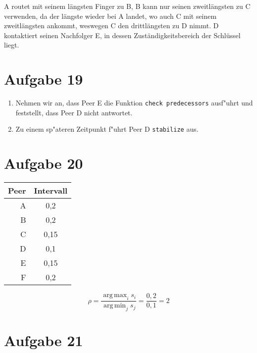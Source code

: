 \documentclass[10pt,a4paper]{article}
\DeclareMathOperator*{\argmax}{arg\,max}
\DeclareMathOperator*{\argmin}{arg\,min}
\begin{document}
A routet mit seinem längsten Finger zu B, B kann nur seinen zweitlängsten zu C verwenden, da der längste wieder bei A landet, wo auch C mit seinem zweitlängsten ankommt, weswegen C den drittlängsten zu D nimmt. D kontaktiert seinen Nachfolger E, in dessen Zuständigkeitsbereich der Schlüssel liegt.
\section*{Aufgabe 19}


\begin{enumerate}

\item Nehmen wir an, dass Peer E die Funktion \verb!check predecessors! ausf"uhrt und feststellt, dass Peer D nicht antwortet.  
\item Zu einem sp"ateren Zeitpunkt f"uhrt Peer D \verb!stabilize! aus.  
\end{enumerate}

\section*{Aufgabe 20}

\begin{tabular}{ r | c }
  Peer & Intervall \\
  \hline
  A & 0,2 \\
  B & 0,2 \\
  C & 0,15 \\
  D & 0,1 \\
  E & 0,15 \\
  F & 0,2 \\
\end{tabular}

\begin{equation}
  \rho = \frac{\argmax_i s_i}{\argmin_j s_j} = \frac{0,2}{0,1} = 2

\end{equation}

\section*{Aufgabe 21}
\end{document}
